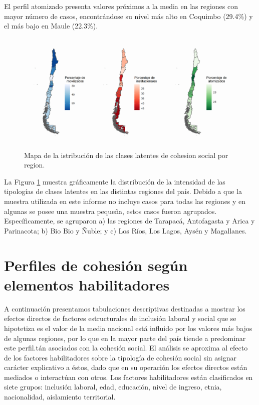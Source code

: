 \documentclass[
  12pt,
]{book}
\begin{document}
El perfil atomizado presenta valores próximos a la media en las regiones con mayor número de casos, encontrándose su nivel más alto en Coquimbo (29.4\%) y el más bajo en Maule (22.3\%).

\begin{figure}[H]

{\centering \includegraphics[width=1\linewidth,height=1\textheight]{output/graphs/mapas_region} 

}

\caption{Mapa de la istribución de las clases latentes de cohesion social por region.}\label{fig:mapas-region}
\end{figure}

La Figura \ref{fig:mapas-region} muestra gráficamente la distribución de la intensidad de las tipologías de clases latentes en las distintas regiones del país. Debido a que la muestra utilizada en este informe no incluye casos para todas las regiones y en algunas se posee una muestra pequeña, estos casos fueron agrupados. Específicamente, se agruparon a) las regiones de Tarapacá, Antofagasta y Arica y Parinacota; b) Bio Bio y Ñuble; y c) Los Ríos, Los Lagos, Aysén y Magallanes.

\hypertarget{perfiles-de-cohesiuxf3n-seguxfan-elementos-habilitadores}{%
\section{Perfiles de cohesión según elementos habilitadores}\label{perfiles-de-cohesiuxf3n-seguxfan-elementos-habilitadores}}

A continuación presentamos tabulaciones descriptivas destinadas a mostrar los efectos directos de factores estructurales de inclusión laboral y social que se hipotetiza es el valor de la media nacional está influido por los valores más bajos de algunas regiones, por lo que en la mayor parte del país tiende a predominar este perfil.tán asociados con la cohesión social. El análisis se aproxima al efecto de los factores habilitadores sobre la tipología de cohesión social sin asignar carácter explicativo a éstos, dado que en su operación los efectos directos están mediados o interactúan con otros. Los factores habilitadores están clasificados en siete grupos: inclusión laboral, edad, educación, nivel de ingreso, etnia, nacionalidad, aislamiento territorial.
\end{document}
